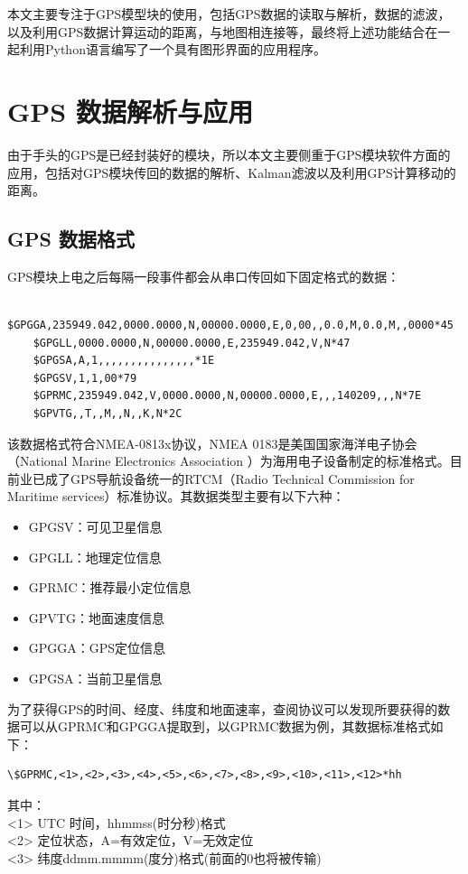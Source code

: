 \documentclass[a4paper, 12pt]{article}
\begin{document}
本文主要专注于GPS模型块的使用，包括GPS数据的读取与解析，数据的滤波，以及利用GPS数据计算运动的距离，与地图相连接等，最终将上述功能结合在一起利用Python语言编写了一个具有图形界面的应用程序。

\section{GPS 数据解析与应用}
由于手头的GPS是已经封装好的模块，所以本文主要侧重于GPS模块软件方面的应用，包括对GPS模块传回的数据的解析、Kalman滤波以及利用GPS计算移动的距离。

\subsection{GPS 数据格式}
GPS模块上电之后每隔一段事件都会从串口传回如下固定格式的数据：
\begin{lstlisting}
    $GPGGA,235949.042,0000.0000,N,00000.0000,E,0,00,,0.0,M,0.0,M,,0000*45
    $GPGLL,0000.0000,N,00000.0000,E,235949.042,V,N*47
    $GPGSA,A,1,,,,,,,,,,,,,,,*1E
    $GPGSV,1,1,00*79
    $GPRMC,235949.042,V,0000.0000,N,00000.0000,E,,,140209,,,N*7E
    $GPVTG,,T,,M,,N,,K,N*2C
\end{lstlisting}
该数据格式符合NMEA-0813x协议，NMEA 0183是美国国家海洋电子协会（National Marine Electronics Association ）为海用电子设备制定的标准格式。目前业已成了GPS导航设备统一的RTCM（Radio Technical Commission for Maritime services）标准协议。其数据类型主要有以下六种：
\begin{itemize}
\item GPGSV：可见卫星信息
\item GPGLL：地理定位信息
\item GPRMC：推荐最小定位信息
\item GPVTG：地面速度信息
\item GPGGA：GPS定位信息
\item GPGSA：当前卫星信息
\end{itemize}
为了获得GPS的时间、经度、纬度和地面速率，查阅协议可以发现所要获得的数据可以从GPRMC和GPGGA提取到，以GPRMC数据为例，其数据标准格式如下：
\begin{lstlisting}
\$GPRMC,<1>,<2>,<3>,<4>,<5>,<6>,<7>,<8>,<9>,<10>,<11>,<12>*hh
\end{lstlisting}
其中：\\
<1> UTC 时间，hhmmss(时分秒)格式\\
<2> 定位状态，A=有效定位，V=无效定位\\
<3> 纬度ddmm.mmmm(度分)格式(前面的0也将被传输)\\
\end{document}
